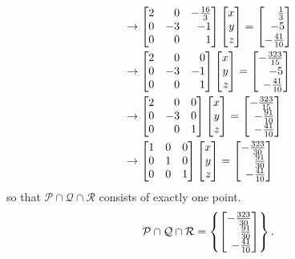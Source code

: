 \begin{exercises}
\begin{problist}
\begin{solution}
\begin{align*}
				&\rightarrow \mat{2&0&-\frac{16}{3}\\0&-3&-1\\0&0&1}\mat{x\\y\\z}=\mat{\frac{1}{3}\\-5\\-\frac{41}{10}}\\
				&\rightarrow \mat{2&0&0\\0&-3&-1\\0&0&1}\mat{x\\y\\z}=\mat{-\frac{323}{15}\\-5\\-\frac{41}{10}}\\
				&\rightarrow \mat{2&0&0\\0&-3&0\\0&0&1}\mat{x\\y\\z}=\mat{-\frac{323}{15}\\-\frac{91}{10}\\-\frac{41}{10}}\\
				&\rightarrow \mat{1&0&0\\0&1&0\\0&0&1}\mat{x\\y\\z}=\mat{-\frac{323}{30}\\ \frac{91}{30}\\-\frac{41}{10}}
			\end{align*}
			so that $\mathcal{P}\cap\mathcal{Q}\cap\mathcal{R}$ consists of exactly one point. 
			\[ \mathcal{P}\cap\mathcal{Q}\cap\mathcal{R}=\left\lbrace\mat{-\frac{323}{30}\\ \frac{91}{30}\\-\frac{41}{10}}\right\rbrace.\]
		\end{solution}	
	\end{problist}
\end{exercises}